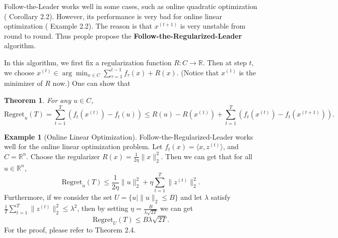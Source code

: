 \documentclass[openany]{book}
\newtheorem{theorem}{Theorem}[chapter]
\theoremstyle{definition}
\newtheorem{example}{Example}[chapter]
\theoremstyle{remark}
\begin{document}
Follow-the-Leader works well in some cases, such as online quadratic optimization (\cite{S11} Corollary 2.2). However, its performance is very bad for online linear optimization (\cite{S11} Example 2.2). The reason is that $x^{(t+1)}$ is very unstable from round to round. Thus people propose the \textbf{Follow-the-Regularized-Leader} algorithm.

In this algorithm, we first fix a regularization function $R:C\to \mathbb{R}$. Then at step $t$, we choose $x^{(t)}\in\arg\min_{x\in C}\sum_{\tau=1}^{t-1}f_{\tau}(x)+R(x)$. (Notice that $x^{(1)}$ is the minimizer of $R$ now.) One can show that
\begin{theorem}\label{followRegLeaderthm}
    For any $u\in C$,
    \begin{equation}\label{followRegLeader}
        \mathrm{Regret}_u(T)=\sum_{t=1}^{T}(f_t(x^{(t)})-f_t(u))\le R(u)-R(x^{(1)})+\sum_{t=1}^{T}(f_t(x^{(t)})-f_t(x^{(t+1)})).
    \end{equation}
\end{theorem}

\begin{example}[Online Linear Optimization]
    Follow-the-Regularized-Leader works well for the online linear optimization problem. Let $f_t(x)=\langle x,z^{(t)}\rangle$, and $C=\mathbb{R}^n$. Choose the regularizer $R(x)=\frac{1}{2\eta}\|x\|_2^2$. Then we can get that for all $u\in \mathbb{R}^n$,
    \begin{equation}\label{onlineLOBound}
        \mathrm{Regret}_u(T)\le \frac{1}{2\eta}\|u\|_2^2+\eta \sum_{t=1}^{T}\|z^{(t)}\|_2^2.
    \end{equation}
    Furthermore, if we consider the set $U=\{u|\|u\|_2\le B\}$ and let $\lambda$ satisfy $\frac{1}{T}\sum_{t=1}^{T}\|z^{(t)}\|_2^2\le\lambda^2$, then by setting $\eta=\frac{B}{\lambda\sqrt{2T}}$ we can get
    \begin{equation}
        \mathrm{Regret}_U(T)\le B\lambda\sqrt{2T}.
    \end{equation}
    For the proof, please refer to \cite{S11} Theorem 2.4.
\end{example}
\end{document}
